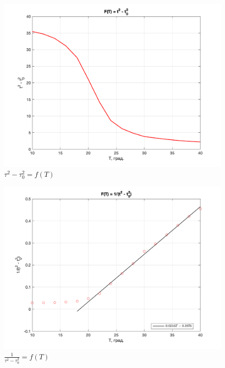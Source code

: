 \documentclass[a4paper, 12pt]{article}
\begin{document}
\begin{figure}[h]
    \centering
    \includegraphics[width=1\textwidth]{first}
    \caption{$\tau^2 - \tau_0^2 = f(T)$}
    \label{fig:first}
\end{figure}

\begin{figure}[h]
    \centering
    \includegraphics[width=1\textwidth]{second}
    \caption{$\frac{1}{\tau^2 - \tau_0^2} = f(T)$}
    \label{fig:second}
\end{figure}
\end{document}

